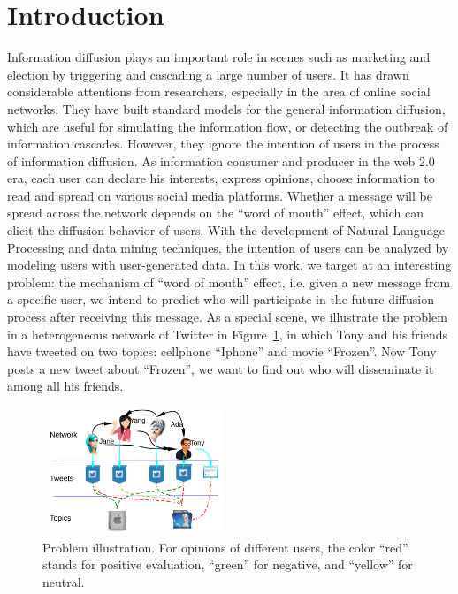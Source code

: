 \documentclass[letterpaper]{article}
\begin{document}
\section{Introduction}
\label{introduction}
\noindent Information diffusion plays an important role in scenes such as marketing and election by triggering and cascading a large number of users. It has drawn considerable attentions from researchers, especially in the area of online social networks. They have built standard models for the general information diffusion, which are useful for simulating the information flow\cite{goldenberg2001talk,kempe2003maximizing}, or detecting the outbreak of information cascades\cite{cheng2014can}. However, they ignore the intention of users in the process of information diffusion. As information consumer and producer in the web 2.0 era, each user can declare his interests, express opinions, choose information to read and spread on various social media platforms. Whether a message will be spread across the network depends on the ``word of mouth'' effect, which can elicit the diffusion behavior of users. With the development of Natural Language Processing and data mining techniques, the intention of users can be analyzed by modeling users with user-generated data. In this work, we target at an interesting problem: the mechanism of ``word of mouth'' effect, i.e. given a new message from a specific user, we intend to predict who will participate in the future diffusion process after receiving this message. 
As a special scene, we illustrate the problem in a heterogeneous network of Twitter in Figure~\ref{fig00}, in which Tony and his friends have tweeted on two topics: cellphone ``Iphone'' and movie ``Frozen''. Now Tony posts a new tweet about ``Frozen'', we want to find out who will disseminate it among all his friends.
\begin{figure}[htb]
\centering
\includegraphics[width=2.2in,height=1.5in]{Mexample.pdf}
\caption{Problem illustration. For opinions of different users, the color ``red'' stands for positive evaluation, ``green'' for negative, and ``yellow'' for neutral.}
\label{fig00}
\end{figure}
\end{document}

